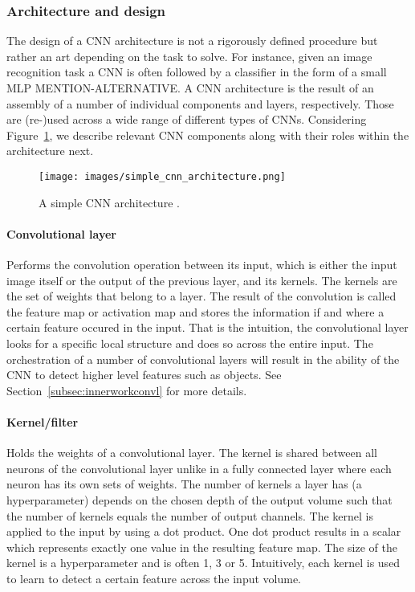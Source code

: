 \documentclass[12pt,a4paper]{article}
\begin{document}
\subsubsection{Architecture and design}
The design of a CNN architecture is not a rigorously defined procedure but rather an art depending on the task to solve. For instance, given an image recognition task a CNN is often followed by a classifier in the form of a small MLP MENTION-ALTERNATIVE. A CNN architecture is the result of an assembly of a number of individual components and layers, respectively. Those are (re-)used across a wide range of different types of CNNs. Considering Figure~\ref{fig:simple_cnn_arch}, we describe relevant CNN components along with their roles within the architecture  next. 
\begin{figure}[H]
\centering
\texttt{[image: images/simple\_cnn\_architecture.png]}
\caption{A simple CNN architecture \cite{cnn_arch_article}.}
\label{fig:simple_cnn_arch}
\end{figure}

\paragraph{Convolutional layer} Performs the convolution operation between its input, which is either the input image itself or the output of the previous layer, and its kernels. The kernels are the set of weights that belong to a layer. The result of the convolution is called the feature map or activation map and stores the information if and where a certain feature occured in the input. That is the intuition, the convolutional layer looks for a specific local structure and does so across the entire input. The orchestration of a number of convolutional layers will result in the ability of the CNN to detect higher level features such as objects. See Section~\ref{subsec:innerworkconvl} for more details.

\paragraph{Kernel/filter            } Holds the weights of a convolutional layer. The kernel is shared between all neurons of the convolutional layer unlike in a fully connected layer where each neuron has its own sets of weights. The number of kernels a layer has (a hyperparameter) depends on the chosen depth of the output volume such that the number of kernels equals the number of output channels. The kernel is applied to the input by using a dot product. One dot product results in a scalar which represents exactly one value in the resulting feature map. The size of the kernel is a hyperparameter and is often 1, 3 or 5. Intuitively, each kernel is used to learn to detect a certain feature across the input volume.
\end{document}
